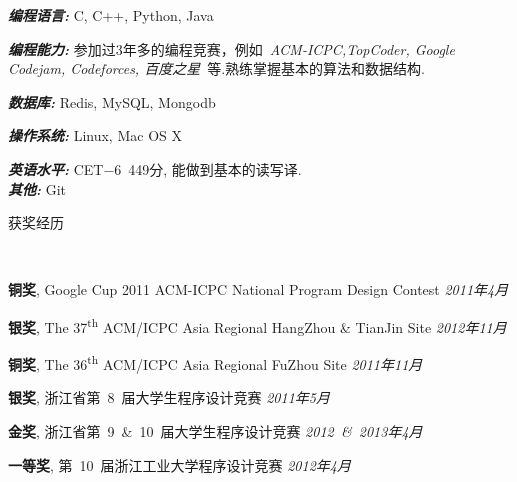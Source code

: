 ﻿\documentclass[9pt]{article}
\newenvironment{changemargin}[2]{%
  \begin{list}{}{%
    \setlength{\topsep}{0pt}%
    \setlength{\leftmargin}{#1}%
    \setlength{\rightmargin}{#2}%
    \setlength{\listparindent}{\parindent}%
    \setlength{\itemindent}{\parindent}%
    \setlength{\parsep}{\parskip}%
  }%
  \item[]}{\end{list}
}
\newcommand{\lineover}{
	\begin{changemargin}{-0.05in}{-0.05in}
		\vspace*{-8pt}
		\hrulefill \\
		\vspace*{-2pt}
	\end{changemargin}
}
\newcommand{\header}[1]{
	\begin{changemargin}{-0.5in}{-0.5in}
		\scshape{#1}\\
  	\lineover
	\end{changemargin}
}
\newenvironment{body} {
	\vspace*{-16pt}
	\begin{changemargin}{-0.25in}{-0.5in}
  }	
	{\end{changemargin}
}
\newcommand\nth{\textsuperscript{th}} %
\begin{document}
\begin{body}
	\vspace{14pt}
	\emph{\textbf{编程语言:}}{} C, C++, Python, Java \\
	\medskip

    \emph{\textbf{编程能力:}}{} 参加过3年多的编程竞赛，例如~\emph{ACM-ICPC,TopCoder, Google Codejam, Codeforces, 百度之星}~等.熟练掌握基本的算法和数据结构.\\
	\medskip

    \emph{\textbf{数据库:}}{} Redis, MySQL, Mongodb \\
    \medskip

	\emph{\textbf{操作系统:}}{} Linux, Mac OS X\\
    \medskip

    \emph{\textbf{英语水平:}}{} CET$-$6~449分, 能做到基本的读写译.\\

    \emph{\textbf{其他:}}{} Git\\

\end{body}

\smallskip

\header{获奖经历}

\begin{body}
	\vspace{14pt}

	\textbf{铜奖}, Google Cup 2011 ACM-ICPC National Program Design Contest \hfill{} \emph{2011年4月}\\
	\smallskip

	\textbf{银奖}, The 37\nth{} ACM/ICPC Asia Regional HangZhou \& TianJin Site \hfill{} \emph{2012年11月}\\
	\smallskip

	\textbf{铜奖}, The 36\nth{} ACM/ICPC Asia Regional FuZhou Site \hfill{} \emph{2011年11月}\\
	\smallskip

	\textbf{银奖}, 浙江省第~8~届大学生程序设计竞赛 \hfill{} \emph{2011年5月}\\
	\smallskip

	\textbf{金奖}, 浙江省第~9~\&~10~届大学生程序设计竞赛 \hfill{} \emph{2012~\&~2013年4月}\\
	\smallskip

	\textbf{一等奖}, 第~10~届浙江工业大学程序设计竞赛 \hfill{} \emph{2012年4月}\\
\end{body}
\end{document}
